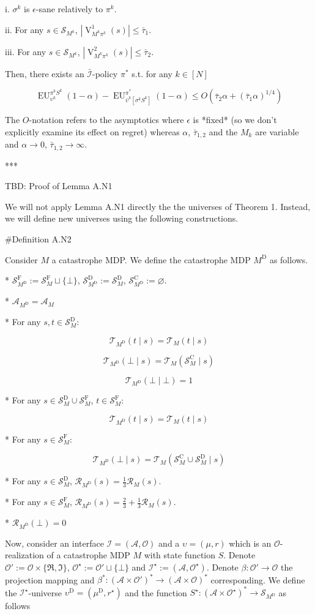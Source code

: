 \documentclass[a4paper]{article}
\newcommand{\AP}[1]{\left(#1\right)}
\newcommand{\AB}[1]{\left[#1\right]}
\newcommand{\Abs}[1]{\left\vert #1 \right\vert}
\newcommand{\Ob}{\mathcal{O}}
\newcommand{\A}{\mathcal{A}}
\newcommand{\St}{\mathcal{S}}
\newcommand{\T}{\mathcal{T}}
\newcommand{\R}{\mathcal{R}}
\newcommand{\In}{\mathcal{I}}
\newcommand{\Adi}{{\bar{\In}}}
\newcommand{\RMC}{\mathrm{C}}
\newcommand{\RMD}{\mathrm{D}}
\newcommand{\RMF}{\mathrm{F}}
\newcommand{\SF}{\St^{\RMF}}
\newcommand{\SD}{\St^{\RMD}}
\newcommand{\SC}{\St^{\RMC}}
\newcommand{\MD}{M^{\RMD}}
\newcommand{\UD}{\upsilon^{\RMD}}
\newcommand{\V}{\operatorname{V}}
\newcommand{\EU}{\operatorname{EU}}
\begin{document}
i. $\sigma^k$ is $\epsilon$-sane relatively to $\pi^k$.

ii. For any $s \in \St_{M^k}$, $\Abs{\V^1_{M^k\pi^k}(s)} \leq \bar{\tau}_1$.

iii. For any $s \in \St_{M^k}$, $\Abs{\V^2_{M^k\pi^k}(s)} \leq \bar{\tau}_2$.

Then, there exists an $\Adi$-policy $\pi^*$ s.t. for any $k \in [N]$

$$\EU_{\upsilon^k}^{\pi^k S^k}(1-\alpha) - \EU_{\bar{\upsilon}^k\AB{\sigma^k S^k}}^{\pi^*}(1-\alpha) \leq O\AP{\bar{\tau}_2 \alpha + (\bar{\tau}_1 \alpha)^{1/4}}$$

The $O$-notation refers to the asymptotics where $\epsilon$ is *fixed* (so we don't explicitly examine its effect on regret) whereas $\alpha$, $\bar{\tau}_{1,2}$ and the $M_k$ are variable and $\alpha \rightarrow 0$, $\bar{\tau}_{1,2} \rightarrow \infty$.

***

TBD: Proof of Lemma A.N1 %

We will not apply Lemma A.N1 directly the the universes of Theorem 1. Instead, we will define new universes using the following constructions.

\#Definition A.N2

Consider $M$ a catastrophe MDP. We define the catastrophe MDP $\MD$ as follows.

* $\SF_{\MD}:=\SF_M \sqcup \{\bot\}$, $\SD_{\MD}:=\SD_M$, $\SC_{\MD}:=\varnothing$.

* $\A_{\MD} = \A_M$

* For any $s,t \in \SD_M$:

$$\T_{\MD}(t \mid s) = \T_M(t \mid s)$$

$$\T_{\MD}(\bot \mid s) = \T_M(\SC_M \mid s)$$

$$\T_{\MD}(\bot \mid \bot) = 1$$

* For any $s \in \SD_M \cup \SF_M$, $t \in \SF_M$:

$$\T_{\MD}(t \mid s) = \T_M(t \mid s)$$

* For any $s \in \SF_M$:

$$\T_{\MD}(\bot \mid s) = \T_M(\SC_M \cup \SD_M \mid s)$$

* For any $s \in \SD_M$, $\R_{\MD}(s) = \frac{1}{3}\R_M(s)$.

* For any $s \in \SF_M$, $\R_{\MD}(s) = \frac{2}{3} + \frac{1}{3}\R_M(s)$.

* $\R_{\MD}(\bot) = 0$

Now, consider an interface $\In=(\A,\Ob)$ and a $\upsilon=(\mu,r)$ which is an $\Ob$-realization of a catastrophe MDP $M$ with state function $S$. Denote $\Ob':=\Ob\times\{\Re,\Im\}$, $\Ob^\star:=\Ob' \sqcup \{\bot\}$ and $\In^\star:=(\A,\Ob^\star)$. Denote $\beta: \Ob' \rightarrow \Ob$ the projection mapping and $\beta^*: \AP{\A \times \Ob'}^* \rightarrow \AP{\A \times \Ob}^*$ corresponding. We define the $\In^\star$-universe $\UD=(\mu^\RMD,r^\star)$ and the function $S^\star: \AP{\A \times \Ob^\star}^* \rightarrow \St_{\MD}$ as follows
\end{document}
